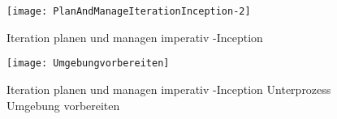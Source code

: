 \begin{figure}[!htbp]
\begin{center}
  \texttt{[image: PlanAndManageIterationInception-2]} %
  \caption{Iteration planen und managen imperativ -Inception}
  \label{fig:PlanAndManageIterationInception-2}
\end{center}
\end{figure}

\begin{figure}[!htbp]
\begin{center}
  \texttt{[image: Umgebungvorbereiten]} %
  \caption{Iteration planen und managen imperativ -Inception Unterprozess Umgebung vorbereiten} 
  \label{fig:Umgebungvorbereiten}
\end{center}
\end{figure}

\clearpage


